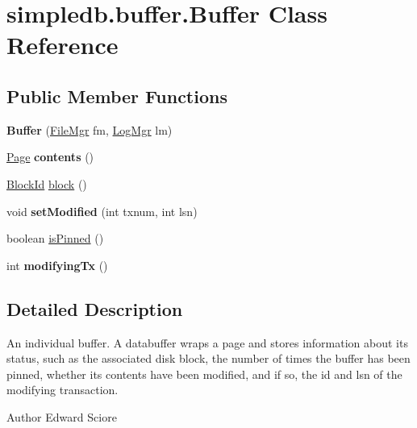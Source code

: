 \hypertarget{classsimpledb_1_1buffer_1_1Buffer}{}\section{simpledb.\+buffer.\+Buffer Class Reference}
\label{classsimpledb_1_1buffer_1_1Buffer}
\subsection*{Public Member Functions}
\begin{DoxyCompactItemize}
\item 
\mbox{\label{classsimpledb_1_1buffer_1_1Buffer_a4265dcc79d434ea5d77054240c58860f}} 
{\bfseries Buffer} (\hyperlink{classsimpledb_1_1file_1_1FileMgr}{File\+Mgr} fm, \hyperlink{classsimpledb_1_1log_1_1LogMgr}{Log\+Mgr} lm)
\item 
\mbox{\label{classsimpledb_1_1buffer_1_1Buffer_a14c7c919a61da2c74bf45fb44801a1ef}} 
\hyperlink{classsimpledb_1_1file_1_1Page}{Page} {\bfseries contents} ()
\item 
\hyperlink{classsimpledb_1_1file_1_1BlockId}{Block\+Id} \hyperlink{classsimpledb_1_1buffer_1_1Buffer_a788d7d5ccd48a559ed05347b3fc05e4f}{block} ()
\item 
\mbox{\label{classsimpledb_1_1buffer_1_1Buffer_a6834011cbda1270a8b8d1aa241df0f2e}} 
void {\bfseries set\+Modified} (int txnum, int lsn)
\item 
boolean \hyperlink{classsimpledb_1_1buffer_1_1Buffer_a01c37a49ef6b653f7aa160f1900edb45}{is\+Pinned} ()
\item 
\mbox{\label{classsimpledb_1_1buffer_1_1Buffer_a0825ea0c277f59a6170b49a21a5ff1b3}} 
int {\bfseries modifying\+Tx} ()
\end{DoxyCompactItemize}


\subsection{Detailed Description}
An individual buffer. A databuffer wraps a page and stores information about its status, such as the associated disk block, the number of times the buffer has been pinned, whether its contents have been modified, and if so, the id and lsn of the modifying transaction. \begin{DoxyAuthor}{Author}
Edward Sciore 
\end{DoxyAuthor}


